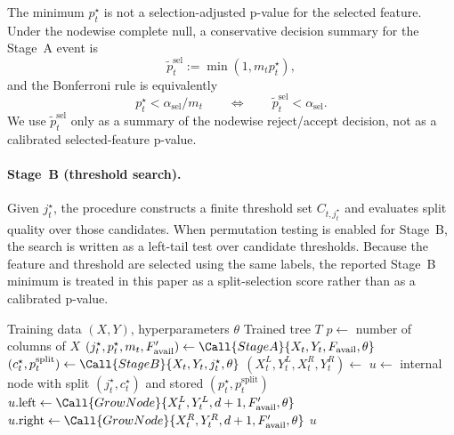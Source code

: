 The minimum $p_t^\star$ is not a selection-adjusted p-value for the selected
feature. Under the nodewise complete null, a conservative decision summary for
the Stage~A event is
%
\begin{equation}
  \tilde p_t^{\mathrm{sel}} := \min(1, m_t p_t^\star),
\end{equation}
%
and the Bonferroni rule is equivalently
%
\begin{equation}
  p_t^\star < \alpha_{\mathrm{sel}}/m_t
  \qquad\Longleftrightarrow\qquad
  \tilde p_t^{\mathrm{sel}} < \alpha_{\mathrm{sel}}.
\end{equation}
%
We use $\tilde p_t^{\mathrm{sel}}$ only as a summary of the nodewise
reject/accept decision, not as a calibrated selected-feature p-value.

\paragraph{Stage~B (threshold search).}
Given $j_t^\star$, the procedure constructs a finite threshold set
$C_{t,j_t^\star}$ and evaluates split quality over those candidates. When
permutation testing is enabled for Stage~B, the search is written as a
left-tail test over candidate thresholds. Because the feature and threshold are
selected using the same labels, the reported Stage~B minimum is treated in
this paper as a split-selection score rather than as a calibrated p-value.

\begin{algorithm}[t]
  \caption{Conditional inference tree training (Stage A $\rightarrow$ Stage B)}
  \label{alg:citree}
  \begin{algorithmic}[1]
    \Require Training data $(X,Y)$, hyperparameters $\theta$
    \Ensure Trained tree $T$
    \State $p \gets$ number of columns of $X$
    \State \Return {}
        \State \Return {}
      \EndIf
      \State $(j_t^\star, p_t^\star, m_t, F_{\mathrm{avail}}') \gets \Call{StageA}{X_t,Y_t,F_{\mathrm{avail}},\theta}$
        \State \Return {}
      \EndIf
      \State $(c_t^\star, p_t^{\mathrm{split}}) \gets \Call{StageB}{X_t,Y_t,j_t^\star,\theta}$
        \State \Return {}
      \EndIf
      \State $(X_t^L,Y_t^L,X_t^R,Y_t^R) \gets$ 
        \State \Return {}
      \EndIf
      \State $u \gets$ internal node with split $(j_t^\star,c_t^\star)$ and stored $(p_t^\star,p_t^{\mathrm{split}})$
      \State $u.\mathrm{left} \gets \Call{GrowNode}{X_t^L,Y_t^L,d+1,F_{\mathrm{avail}}',\theta}$
      \State $u.\mathrm{right} \gets \Call{GrowNode}{X_t^R,Y_t^R,d+1,F_{\mathrm{avail}}',\theta}$
      \State \Return $u$
    \EndProcedure
  \end{algorithmic}
\end{algorithm}

